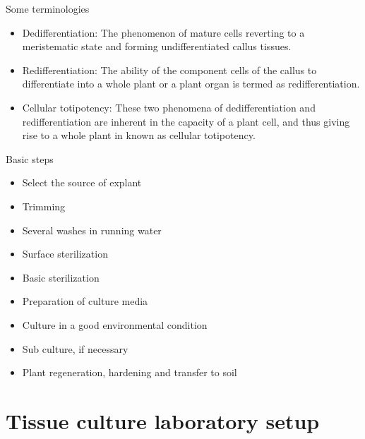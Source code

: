 \documentclass[
  ignorenonframetext,
  aspectratio=169]{beamer}
\providecommand{\tightlist}{%
  \setlength{\itemsep}{0pt}\setlength{\parskip}{0pt}}
\begin{document}
\begin{frame}{Some terminologies}
\protect\hypertarget{some-terminologies}{}
\begin{itemize}
\tightlist
\item
  Dedifferentiation: The phenomenon of mature cells reverting to a
  meristematic state and forming undifferentiated callus tissues.
\item
  Redifferentiation: The ability of the component cells of the callus to
  differentiate into a whole plant or a plant organ is termed as
  redifferentiation.
\item
  Cellular totipotency: These two phenomena of dedifferentiation and
  redifferentiation are inherent in the capacity of a plant cell, and
  thus giving rise to a whole plant in known as cellular totipotency.
\end{itemize}
\end{frame}

\begin{frame}{Basic steps}
\protect\hypertarget{basic-steps}{}
\begin{itemize}
\tightlist
\item
  Select the source of explant
\item
  Trimming
\item
  Several washes in running water
\item
  Surface sterilization
\item
  Basic sterilization
\item
  Preparation of culture media
\item
  Culture in a good environmental condition
\item
  Sub culture, if necessary
\item
  Plant regeneration, hardening and transfer to soil
\end{itemize}
\end{frame}

\hypertarget{tissue-culture-laboratory-setup}{%
\section{Tissue culture laboratory
setup}\label{tissue-culture-laboratory-setup}}
\end{document}
